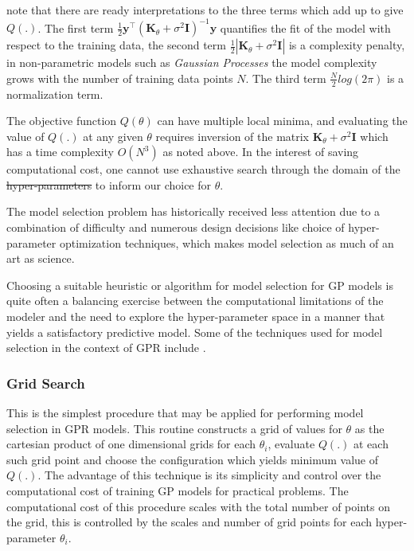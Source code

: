 \documentclass{article}
\providecommand{\DIFadd}[1]{{\protect\color{blue}\uwave{#1}}} %
\providecommand{\DIFdel}[1]{{\protect\color{red}\sout{#1}}}                      %
\providecommand{\DIFaddbegin}{} %
\providecommand{\DIFaddend}{} %
\providecommand{\DIFdelbegin}{} %
\providecommand{\DIFdelend}{} %
\newcommand{\DIFscaledelfig}{0.5}
\newlength{\DIFdelgraphicswidth} %
\newlength{\DIFdelgraphicsheight} %
\newcommand{\DIFaddincludegraphics}[2][]{{\color{blue}\fbox{\DIFOincludegraphics[#1]{#2}}}} %
\newcommand{\DIFdelincludegraphics}[2][]{%
\sbox{\DIFdelgraphicsbox}{\DIFOincludegraphics[#1]{#2}}%
\settoboxwidth{\DIFdelgraphicswidth}{\DIFdelgraphicsbox} %
\settoboxtotalheight{\DIFdelgraphicsheight}{\DIFdelgraphicsbox} %
\scalebox{\DIFscaledelfig}{%
\parbox[b]{\DIFdelgraphicswidth}{\usebox{\DIFdelgraphicsbox}\\[-\baselineskip] \rule{\DIFdelgraphicswidth}{0em}}\llap{\resizebox{\DIFdelgraphicswidth}{\DIFdelgraphicsheight}{%
\setlength{\unitlength}{\DIFdelgraphicswidth}%
\begin{picture}(1,1)%
\thicklines\linethickness{2pt} %
{\color[rgb]{1,0,0}\put(0,0){\framebox(1,1){}}}%
{\color[rgb]{1,0,0}\put(0,0){\line( 1,1){1}}}%
{\color[rgb]{1,0,0}\put(0,1){\line(1,-1){1}}}%
\end{picture}%
}\hspace*{3pt}}} %
} %
\DeclareRobustCommand{\DIFaddbegin}{\DIFOaddbegin \let\includegraphics\DIFaddincludegraphics} %
\DeclareRobustCommand{\DIFaddend}{\DIFOaddend \let\includegraphics\DIFOincludegraphics} %
\DeclareRobustCommand{\DIFdelbegin}{\DIFOdelbegin \let\includegraphics\DIFdelincludegraphics} %
\DeclareRobustCommand{\DIFdelend}{\DIFOaddend \let\includegraphics\DIFOincludegraphics} %
\begin{document}
\citet{Rasmussen:2005:GPM:1162254} note that there are ready interpretations to the three terms which add up to give $Q(.)$. The first term $\frac{1}{2} \mathbf{y}^\intercal (\mathbf{K}_\theta + \sigma^{2} \mathbf{I})^{-1} \mathbf{y}$ quantifies the fit of the model with respect to the training data, the second term $\frac{1}{2}|\mathbf{K}_\theta + \sigma^{2} \mathbf{I}|$ is a complexity penalty, in non-parametric models such as \emph{Gaussian Processes} the model complexity grows with the number of training data points $N$. The third term $\frac{N}{2}log(2\pi)$ is a normalization term.

The objective function $Q(\theta)$ can have multiple local minima, and evaluating the value of $Q(.)$ at any given $\theta$ requires inversion of the matrix $\mathbf{K}_\theta + \sigma^{2} \mathbf{I}$ which has a time complexity $O(N^3)$ as noted above. In the interest of saving computational cost, one cannot use exhaustive search through the domain of the \DIFdelbegin \DIFdel{hyper-parameters }\DIFdelend \DIFaddbegin \DIFadd{hyperparameters }\DIFaddend to inform our choice for $\theta$.

The model selection problem has historically received less attention
due to a combination of difficulty and numerous design decisions like
choice of hyper-parameter optimization techniques, which makes model
selection as much of an art as science. 
\DIFaddbegin 

\DIFaddend Choosing a suitable heuristic or algorithm for model selection for GP
models is quite often a balancing exercise between the computational
limitations of the modeler and the need to explore the hyper-parameter
space in a manner that yields a satisfactory predictive model. Some of
the techniques used for model selection in the context of GPR include
\DIFaddbegin \DIFadd{the following}\DIFaddend .


\subsubsection*{Grid Search}

This is the simplest procedure that may be applied for performing model selection in GPR models. This routine constructs a grid of values for $\theta$ as the cartesian product of one dimensional grids for each $\theta_i$, evaluate $Q(.)$ at each such grid point and choose the configuration which yields minimum value of $Q(.)$. The advantage of this technique is its simplicity and control over the computational cost of training GP models for practical problems. The computational cost of this procedure scales with the total number of points on the grid, this is controlled by the scales and number of grid points for each hyper-parameter $\theta_i$.
\end{document}
